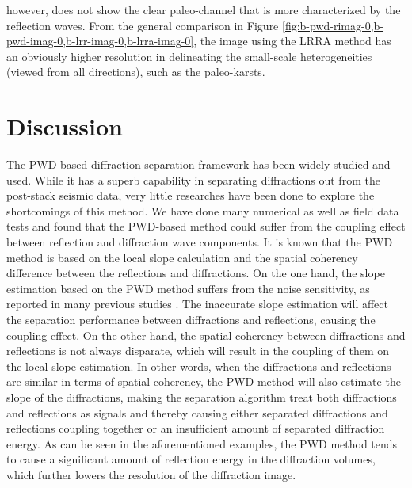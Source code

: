 however, does not show the clear paleo-channel that is more characterized by the reflection waves. From the general comparison in Figure \ref{fig:b-pwd-rimag-0,b-pwd-imag-0,b-lrr-imag-0,b-lrra-imag-0}, the image using the LRRA method has an obviously higher resolution in delineating the small-scale heterogeneities (viewed from all directions), such as the paleo-karsts. 

\section{Discussion}
The PWD-based diffraction separation framework has been widely studied and used. While it has a superb capability in separating diffractions out from the post-stack seismic data, very little researches have been done to explore the shortcomings of this method. We have done many numerical as well as field data tests and found that the PWD-based method could suffer from the coupling effect between reflection and diffraction wave components. It is known that the PWD method is based on the local slope calculation and the spatial coherency difference between the reflections and diffractions. On the one hand, the slope estimation based on the PWD method suffers from the noise sensitivity, as reported in many previous studies \cite[]{shaohuan2017,wanghang2020tgrs2,chenwei2021geo,chenwei2021tgrs2}. The inaccurate slope estimation will affect the separation performance between diffractions and reflections, causing the coupling effect. On the other hand, the spatial coherency between diffractions and reflections is not always disparate, which will result in the coupling of them on the local slope estimation. In other words, when the diffractions and reflections are similar in terms of spatial coherency, the PWD method will also estimate the slope of the diffractions, making the separation algorithm treat both diffractions and reflections as signals and thereby causing either separated diffractions and reflections coupling together or an insufficient amount of separated diffraction energy. As can be seen in the aforementioned examples, the PWD method tends to cause a significant amount of reflection energy in the diffraction volumes, which further lowers the resolution of the diffraction image.

